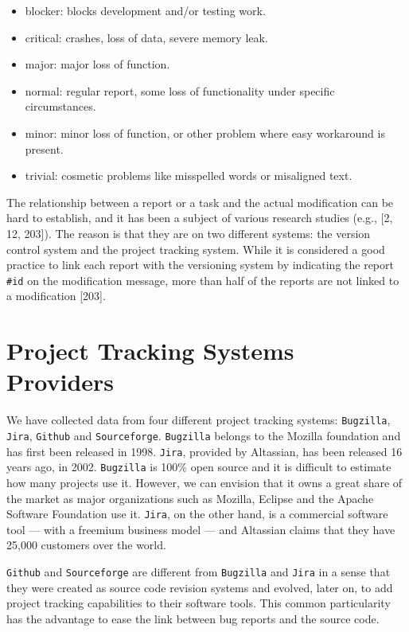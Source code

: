 \documentclass[12pt]{report}
\providecommand{\tightlist}{%
  \setlength{\itemsep}{0pt}\setlength{\parskip}{0pt}}
\begin{document}
\begin{itemize}
\tightlist
\item
  blocker: blocks development and/or testing work.
\item
  critical: crashes, loss of data, severe memory leak.
\item
  major: major loss of function.
\item
  normal: regular report, some loss of functionality under specific
  circumstances.
\item
  minor: minor loss of function, or other problem where easy workaround
  is present.
\item
  trivial: cosmetic problems like misspelled words or misaligned text.
\end{itemize}

The relationship between a report or a task and the actual modification
can be hard to establish, and it has been a subject of various research
studies (e.g., {[}2, 12, 203{]}). The reason is that they are on two
different systems: the version control system and the project tracking
system. While it is considered a good practice to link each report with
the versioning system by indicating the report \lstinline!#id! on the
modification message, more than half of the reports are not linked to a
modification {[}203{]}.

\section{\texorpdfstring{Project Tracking Systems
Providers\label{sec:bug-provider}}{Project Tracking Systems Providers}}\label{project-tracking-systems-providers}

We have collected data from four different project tracking systems:
\lstinline!Bugzilla!, \lstinline!Jira!, \lstinline!Github! and
\lstinline!Sourceforge!. \lstinline!Bugzilla! belongs to the Mozilla
foundation and has first been released in 1998. \lstinline!Jira!,
provided by Altassian, has been released 16 years ago, in 2002.
\lstinline!Bugzilla! is 100\% open source and it is difficult to
estimate how many projects use it. However, we can envision that it owns
a great share of the market as major organizations such as Mozilla,
Eclipse and the Apache Software Foundation use it. \lstinline!Jira!, on
the other hand, is a commercial software tool --- with a freemium
business model --- and Altassian claims that they have 25,000 customers
over the world.

\lstinline!Github! and \lstinline!Sourceforge! are different from
\lstinline!Bugzilla! and \lstinline!Jira! in a sense that they were
created as source code revision systems and evolved, later on, to add
project tracking capabilities to their software tools. This common
particularity has the advantage to ease the link between bug reports and
the source code.
\end{document}
